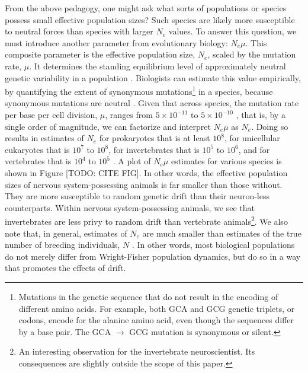 \documentclass[twocolumn]{article}
\begin{document}
From the above pedagogy, one might ask what sorts of populations or species possess small effective population sizes? Such species are likely more susceptible to neutral forces than species with larger $N_e$ values. To answer this question, we must introduce another parameter from evolutionary biology: $N_e \mu$. This composite parameter is the effective population size, $N_e$, scaled by the mutation rate, $\mu$. It determines the standing equilibrium level of approximately neutral genetic variability in a population \cite{kimura1983neutral, Lynch_Conery_2003, charlesworth_2009}. Biologists can estimate this value empirically, by quantifying the extent of synonymous mutations\footnote{Mutations in the genetic sequence that do not result in the encoding of different amino acids. For example, both GCA and GCG genetic triplets, or codons, encode for the alanine amino acid, even though the sequences differ by a base pair. The GCA $\rightarrow$ GCG mutation is synonymous or silent.} in a species, because synonymous mutations are neutral \cite{Lynch_Conery_2003}. Given that across species, the mutation rate per base per cell division, $\mu$, ranges from $5\times 10^{-11} \text{ to } 5\times10^{-10}$ \cite{drake_1998}, that is, by a single order of magnitude, we can factorize and interpret $N_e\mu$ as $N_e$. Doing so results in estimates of $N_e$ for prokaryotes that is at least $10^8$, for unicellular eukaryotes that is $10^7$ to $10^8$, for invertebrates that is $10^5$ to $10^6$, and for vertebrates that is $10^4$ to $10^5$ \cite{Lynch_Conery_2003}. A plot of $N_e\mu$ estimates for various species is shown in Figure [TODO: CITE FIG]. In other words, the effective population sizes of nervous system-possessing animals is far smaller than those without. They are more susceptible to random genetic drift than their neuron-less counterparts. Within nervous system-possessing animals, we see that invertebrates are less privy to random drift than vertebrate animals\footnote{An interesting observation for the invertebrate neuroscientist. Its consequences are slightly outside the scope of this paper.}. We also note that, in general, estimates of $N_e$ are much smaller than estimates of the true number of breeding individuals, $N$ \cite{lynch2007origins, crow_newton_1955, frankham_1995}. In other words, most biological populations do not merely differ from Wright-Fisher population dynamics, but do so in a way that promotes the effects of drift. 
\end{document}
